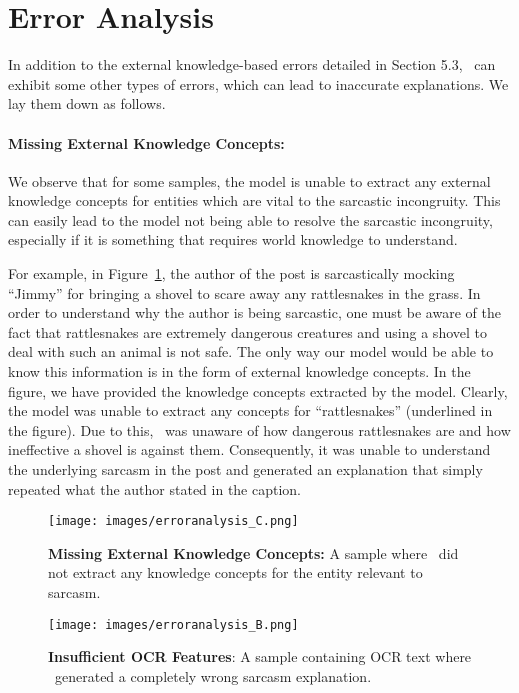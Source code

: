 \appendix
\section{Error Analysis}

In addition to the external knowledge-based errors detailed in Section 5.3, \model\ can exhibit some other types of errors, which can lead to inaccurate explanations. We lay them down as follows.

\paragraph{Missing External Knowledge Concepts:} We observe that for some samples, the model is unable to extract any external knowledge concepts for entities which are vital to the sarcastic incongruity. This can easily lead to the model not being able to resolve the sarcastic incongruity, especially if it is something that requires world knowledge to understand. 

For example, in Figure~\ref{fig:error-analysis-no-knowledge}, the author of the post is sarcastically mocking ``Jimmy'' for bringing a shovel to scare away any rattlesnakes in the grass. In order to understand why the author is being sarcastic, one must be aware of the fact that rattlesnakes are extremely dangerous creatures and using a shovel to deal with such an animal is not safe. The only way our model would be able to know this information is in the form of external knowledge concepts. In the figure, we have provided the knowledge concepts extracted by the model. Clearly, the model was unable to extract any concepts for ``rattlesnakes'' (underlined in the figure). Due to this, \model\ was unaware of how dangerous rattlesnakes are and how ineffective a shovel is against them. Consequently, it was unable to understand the underlying sarcasm in the post and generated an explanation that simply repeated what the author stated in the caption.

\begin{figure}[!t]
\centering
  \texttt{[image: images/erroranalysis\_C.png]}
  \caption{\textbf{Missing External Knowledge Concepts:} A sample where \model\ did not extract any knowledge concepts for the entity relevant to sarcasm. %
}
\label{fig:error-analysis-no-knowledge}
\end{figure}

\begin{figure}[!t]
\centering
  \texttt{[image: images/erroranalysis\_B.png]}
  \caption{\textbf{Insufficient OCR Features}: A sample containing OCR text where \model\ generated a completely wrong sarcasm explanation. %
}
\label{fig:error-analysis-OCR}
\end{figure}


